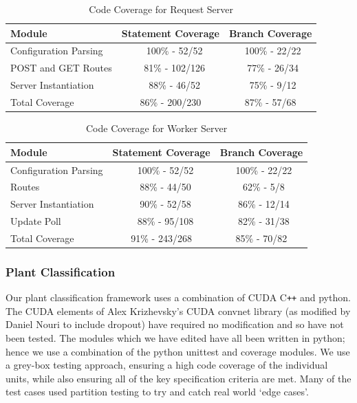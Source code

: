 \documentclass[a4paper,11pt]{article}
\begin{document}
\begin{table}[h]
   \centering
    \begin{tabular}{|l|cc|}
    \hline
    Module                 & Statement Coverage  & Branch Coverage \\ \hline
    Configuration Parsing  & ~   100\% - 52/52   & ~100\% - 22/22     \\
    POST and GET Routes    & ~   81\%  - 102/126   & ~77\%  - 26/34      \\
    Server Instantiation   & ~   88\%  - 46/52   & ~75\%  - 9/12     \\
    \hline
    Total Coverage         &     86\%  - 200/230 & 87\%   - 57/68	\\      
    \hline
    \end{tabular}
    \caption {Code Coverage for Request Server}
\end{table}

\begin{table}[h]
   \centering
    \begin{tabular}{|l|cc|}
    \hline
    Module                & Statement Coverage & Branch Coverage \\ \hline
    Configuration Parsing & ~   100\% - 52/52  & ~100\% - 22/22     \\
    Routes                & ~   88\% - 44/50   &  ~62\%  - 5/8      \\
    Server Instantiation  & ~   90\% - 52/58   &  ~86\%  - 12/14      \\
    Update Poll           & ~   88\% - 95/108   &  ~82\%  - 31/38      \\
    \hline
    Total Coverage        &     91\% - 243/268     & 85\%   - 70/82  \\      
    \hline
    \end{tabular}
    \caption {Code Coverage for Worker Server}
\end{table}

\clearpage
\subsubsection{Plant Classification}

Our plant classification framework uses a combination of CUDA C\verb!++! and python. The CUDA elements of Alex Krizhevsky's CUDA convnet library (as modified by Daniel Nouri to include dropout) have required no modification and so have not been tested. The modules which we have edited have all been written in python; hence we use a combination of the python unittest and coverage modules. We use a grey-box testing approach, ensuring a high code coverage of the individual units, while also ensuring all of the key specification criteria are met. Many of the test cases used partition testing to try and catch real world `edge cases'.
\end{document}
